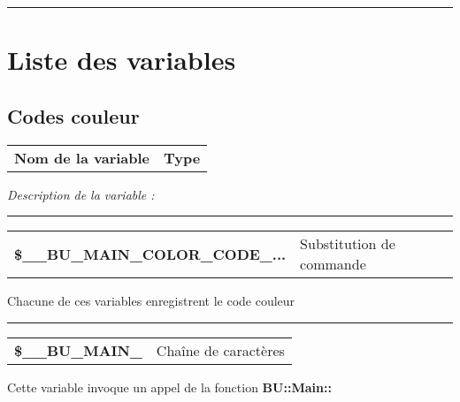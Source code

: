 \documentclass[a4paper,10pt]{article}
\begin{document}
\color{sec1}\par\noindent\rule{\textwidth}{0.4pt}\color{text}

\color{sec1}
\section{Liste des variables}\color{text}

\color{sec2}
\subsection{Codes couleur}\color{text}

\begin{justify}
    \begin{tabular}{l|l}
        \textbf{Nom de la variable} & \textbf{Type}
    \end{tabular}
\end{justify}

\begin{justify}
    \textit{Description de la variable :}
\end{justify}


\par\noindent\rule{\textwidth}{0.4pt}

\begin{justify}
    \begin{tabular}{l|l}
        \textbf{\color{vars}\$\_\_BU\_MAIN\_COLOR\_CODE\_...}  & Substitution de commande\\
    \end{tabular}
\end{justify}

\begin{justify}
    Chacune de ces variables enregistrent le code couleur
\end{justify}


\par\noindent\rule{\textwidth}{0.4pt}

\begin{justify}
    \begin{tabular}{l|l}
        \textbf{\color{vars}\$\_\_BU\_MAIN\_}  & Chaîne de caractères \\[1\baselineskip]
    \end{tabular}
\end{justify}

\begin{justify}
    Cette variable invoque un appel de la fonction \textbf{\color{func}BU::Main::}
\end{justify}
\end{document}
